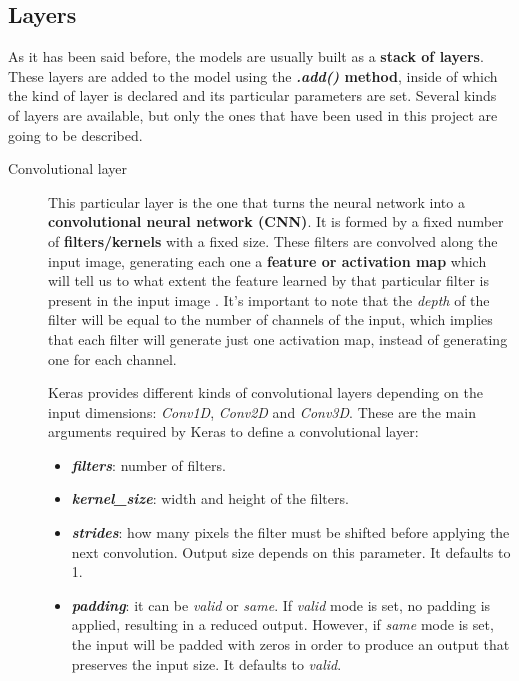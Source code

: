 \subsection{Layers}\label{subsec:layers}
As it has been said before, the models are usually built as a \textbf{stack of layers}. These layers are added to the model using the \textbf{\textit{.add()} method}, inside of which the kind of layer is declared and its particular parameters are set. Several kinds of layers are available, but only the ones that have been used in this project are going to be described.
\begin{description}
	\item[Convolutional layer] This particular layer is the one that turns the neural network into a \textbf{convolutional neural network (CNN)}. It is formed by a fixed number of \textbf{filters/kernels} with a fixed size. These filters are convolved along the input image, generating each one a \textbf{feature or activation map} which will tell us to what extent the feature learned by that particular filter is present in the input image \cite{cs231n}. It's important to note that the \textit{depth} of the filter will be equal to the number of channels of the input, which implies that each filter will generate just one activation map, instead of generating one for each channel. 
	
	Keras provides different kinds of convolutional layers depending on the input dimensions: \textit{Conv1D}, \textit{Conv2D} and \textit{Conv3D}. These are the main arguments required by Keras to define a convolutional layer:
	\begin{itemize}
		\item \textbf{\textit{filters}}: number of filters.
		
		\item \textbf{\textit{kernel\_size}}: width and height of the filters.
		
		\item \textbf{\textit{strides}}: how many pixels the filter must be shifted before applying the next convolution. Output size depends on this parameter. It defaults to 1.
		
		\item \textbf{\textit{padding}}: it can be \textit{valid} or \textit{same}. If \textit{valid} mode is set, no padding is applied, resulting in a reduced output. However, if \textit{same} mode is set, the input will be padded with zeros in order to produce an output that preserves the input size. It defaults to \textit{valid}.
	\end{itemize}


\end{description}
